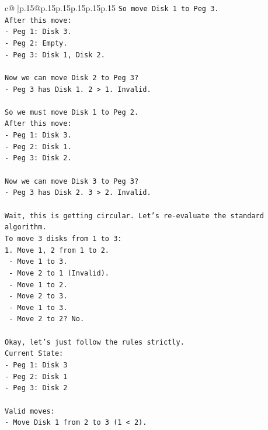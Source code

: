 \documentclass{article}
\begin{document}
{\begin{supertabular}{c@{$\;$}|p{.15\linewidth}@{}p{.15\linewidth}p{.15\linewidth}p{.15\linewidth}p{.15\linewidth}p{.15\linewidth}}
{{{\texttt{So move Disk 1 to Peg 3.} \\
\texttt{After this move:} \\
\texttt{{-} Peg 1: Disk 3.} \\
\texttt{{-} Peg 2: Empty.} \\
\texttt{{-} Peg 3: Disk 1, Disk 2.} \\
\\ 
\texttt{Now we can move Disk 2 to Peg 3?} \\
\texttt{{-} Peg 3 has Disk 1. 2 > 1. Invalid.} \\
\\ 
\texttt{So we must move Disk 1 to Peg 2.} \\
\texttt{After this move:} \\
\texttt{{-} Peg 1: Disk 3.} \\
\texttt{{-} Peg 2: Disk 1.} \\
\texttt{{-} Peg 3: Disk 2.} \\
\\ 
\texttt{Now we can move Disk 3 to Peg 3?} \\
\texttt{{-} Peg 3 has Disk 2. 3 > 2. Invalid.} \\
\\ 
\texttt{Wait, this is getting circular. Let's re{-}evaluate the standard algorithm.} \\
\texttt{To move 3 disks from 1 to 3:} \\
\texttt{1. Move 1, 2 from 1 to 2.} \\
\texttt{   {-} Move 1 to 3.} \\
\texttt{   {-} Move 2 to 1 (Invalid).} \\
\texttt{   {-} Move 1 to 2.} \\
\texttt{   {-} Move 2 to 3.} \\
\texttt{   {-} Move 1 to 3.} \\
\texttt{   {-} Move 2 to 2? No.} \\
\\ 
\texttt{Okay, let's just follow the rules strictly.} \\
\texttt{Current State:} \\
\texttt{{-} Peg 1: Disk 3} \\
\texttt{{-} Peg 2: Disk 1} \\
\texttt{{-} Peg 3: Disk 2} \\
\\ 
\texttt{Valid moves:} \\
\texttt{{-} Move Disk 1 from 2 to 3 (1 < 2).} \\
}}}
\end{supertabular}}
\end{document}
